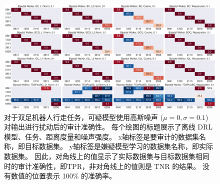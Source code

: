 \begin{figure}[!t]
    \includegraphics[width=\hsize]{figure/orl_auditor/overall_sac_bipedalwalker_20230201161849913.pdf}
    \caption{
    对于双足机器人行走任务，可疑模型使用高斯噪声 ($\mu=0, \sigma=0.1$) 对输出进行扰动后的审计准确性。
    每个绘图的标题展示了离线 DRL 模型、任务、距离度量和噪声强度。
    x轴标签是要审计的数据集名称，即目标数据集。
    y轴标签是嫌疑模型学习的数据集名称，即实际数据集。
    因此，对角线上的值显示了实际数据集与目标数据集相同时的审计准确性，即TPR，非对角线上的值则是 TNR 的结果。
    没有数值的位置表示 100\% 的准确率。
    }
    \label{fig:robustness 0.1 on bipedalwalker}
\end{figure}
    
